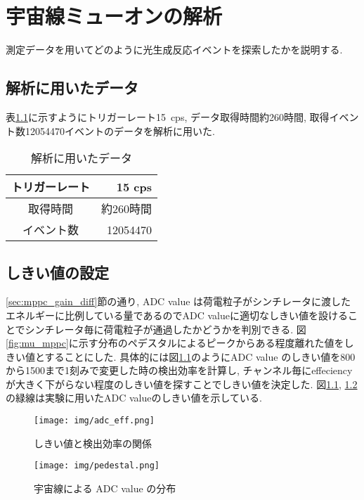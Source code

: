 \chapter{宇宙線ミューオンの解析}\label{analysis}
測定データを用いてどのように光生成反応イベントを探索したかを説明する.

\section{解析に用いたデータ}\label{sec:anal:data}
表\ref{tab:analyzed_data}に示すようにトリガーレート15\ cps, データ取得時間約260時間, 取得イベント数12054470イベントのデータを解析に用いた.
\begin{table}[H]
    \centering
    \caption{解析に用いたデータ}
    \label{tab:analyzed_data}
    \begin{tabular}{|c|r|}
        \hline
        トリガーレート & 15 cps    \\ \hline
        取得時間       & 約260時間 \\ \hline
        イベント数     & 12054470  \\ \hline
    \end{tabular}
\end{table}

\section{しきい値の設定}\label{sec:anal:threshold}
\ref{sec:mppc_gain_diff}節の通り, ADC value は荷電粒子がシンチレータに渡したエネルギーに比例している量であるのでADC valueに適切なしきい値を設けることでシンチレータ毎に荷電粒子が通過したかどうかを判別できる.
図\ref{fig:mu_mppc}に示す分布のペデスタルによるピークからある程度離れた値をしきい値とすることにした.
具体的には図\ref{fig:adc_eff}のようにADC value のしきい値を800から1500まで1刻みで変更した時の検出効率を計算し, チャンネル毎にeffeciencyが大きく下がらない程度のしきい値を探すことでしきい値を決定した.
図\ref{fig:adc_eff}, \ref{fig:threhist} の緑線は実験に用いたADC valueのしきい値を示している.
\begin{figure}[H]
    \centering
    \texttt{[image: img/adc\_eff.png]}
    \caption{しきい値と検出効率の関係}
    \label{fig:adc_eff}
\end{figure}
\begin{figure}[H]
    \centering
    \texttt{[image: img/pedestal.png]}
    \caption{宇宙線による ADC value の分布}
    \label{fig:threhist}
\end{figure}

